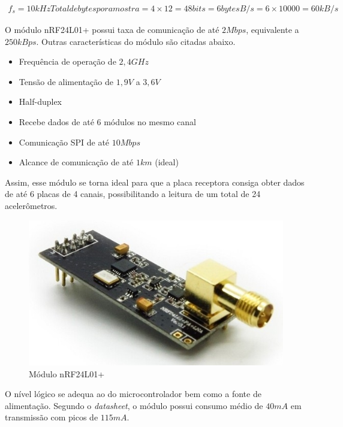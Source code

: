 \documentclass[11pt]{abntex2}
\begin{document}
				\begin{gather*}
					f_s = 10kHz
					Total de bytes por amostra = 4\times 12 = 48 bits = 6 bytes
					B/s = 6\times 10000 = 60kB/s
				\end{gather*}

				O módulo nRF24L01+\cite{nrf} possui taxa de comunicação de até $2Mbps$,
				equivalente a $250kBps$. Outras características do módulo são
				citadas abaixo.

				\begin{itemize}
					\item Frequência de operação de $2,4GHz$
					\item Tensão de alimentação de $1,9V$ a $3,6V$
					\item Half-duplex
					\item Recebe dados de até 6 módulos no mesmo canal
					\item Comunicação SPI de até $10Mbps$
					\item Alcance de comunicação de até $1km$ (ideal)
				\end{itemize}

				Assim, esse módulo se torna ideal para que a placa receptora consiga
				obter dados de até 6 placas de 4 canais, possibilitando a leitura de
				um total de 24 acelerômetros.

				\begin{figure}[!ht]
					\centering
					\includegraphics[scale = 0.6]{../../Fotos/nrf.jpg}
					\caption[Módulo nRF24L01+]{Módulo nRF24L01+ \footnotemark}
				\end{figure}


				O nível lógico se adequa ao do microcontrolador bem como a fonte
				de alimentação. Segundo o \textit{datasheet}, o módulo possui
				consumo médio de $40mA$ em transmissão com picos de $115mA$.
\end{document}

